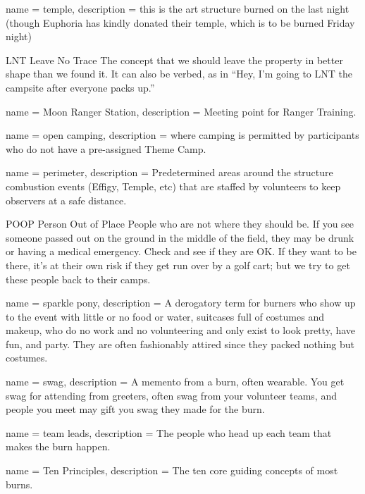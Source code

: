  {
name = {temple},
description = {this is the art structure burned on the last night (though Euphoria has kindly donated their temple, which is to be burned Friday night)}
}

{LNT}
{Leave No Trace}
{The concept that we should leave the property in better shape than we found it. It can also be verbed, as in ``Hey, I'm going to LNT the campsite after everyone packs up.'' }

 {
name = {Moon Ranger Station},
description = {Meeting point for Ranger Training.}
}

 {
name = {open camping},
description = {where camping is permitted by participants who do not have a pre-assigned Theme Camp.}
}

 {
name = {perimeter},
description = {Predetermined areas around the structure combustion events (Effigy, Temple, etc) that are staffed by volunteers to keep observers at a safe distance.}
}

{POOP}
{Person Out of Place}
{People who are not where they should be. If you see someone passed out on the ground in the middle of the field, they may be drunk or having a medical emergency. Check and see if they are OK. If they want to be there, it's at their own risk if they get run over by a golf cart; but we try to get these people back to their camps.}

 {
name = {sparkle pony},
description = {A derogatory term for burners who show up to the event with little or no food or water, suitcases full of costumes and makeup, who do no work and no volunteering and only exist to look pretty, have fun, and party. They are often fashionably attired since they packed nothing but costumes.}
}

 {
name = {swag},
description = {A memento from a burn, often wearable. You get swag for attending from \glspl{greeter}, often swag from your volunteer teams, and people you meet may gift you swag they made for the burn.}
}

 {
name = {team leads},
description = {The people who head up each team that makes the burn happen.}
}

 {
name = {Ten Principles},
description = {The ten core guiding concepts of most burns. }
}

